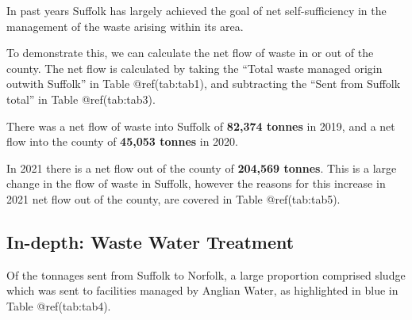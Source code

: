 \documentclass[
]{article}
\begin{document}
In past years Suffolk has largely achieved the goal of net
self-sufficiency in the management of the waste arising within its area.

To demonstrate this, we can calculate the net flow of waste in or out of
the county. The net flow is calculated by taking the ``Total waste
managed origin outwith Suffolk'' in Table @ref(tab:tab1), and
subtracting the ``Sent from Suffolk total'' in Table @ref(tab:tab3).

There was a net flow of waste into Suffolk of \textbf{82,374 tonnes} in
2019, and a net flow into the county of \textbf{45,053 tonnes} in 2020.

In 2021 there is a net flow out of the county of \textbf{204,569
tonnes}. This is a large change in the flow of waste in Suffolk, however
the reasons for this increase in 2021 net flow out of the county, are
covered in Table @ref(tab:tab5).

\hypertarget{in-depth-waste-water-treatment}{%
\subsection{In-depth: Waste Water
Treatment}\label{in-depth-waste-water-treatment}}

Of the tonnages sent from Suffolk to Norfolk, a large proportion
comprised sludge which was sent to facilities managed by Anglian Water,
as highlighted in blue in Table @ref(tab:tab4).

\providecommand{\docline}[3]{\noalign{\global\setlength{\arrayrulewidth}{#1}}\arrayrulecolor[HTML]{#2}\cline{#3}}

\setlength{\tabcolsep}{0pt}

\renewcommand*{\arraystretch}{1.5}
\end{document}

